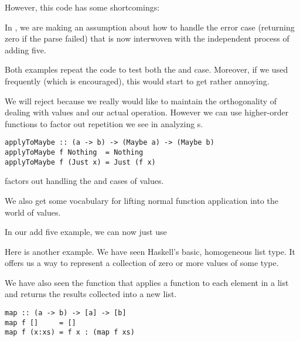 \begin{notelist}
    \item However, this code has some shortcomings:
    \begin{notelist}
        \item In , we are making an assumption about how to handle the error case
              (returning zero if the parse failed) that is now interwoven with the independent process
              of adding five.
        \item Both examples repeat the code to test both the  and  case. Moreover,
              if we used  frequently (which is encouraged), this would start to get rather
              annoying.
    \end{notelist}
\end{notelist}

We will reject  because we really would like to maintain the orthogonality of
dealing with  values and our actual operation. However we can use higher-order
functions to factor out repetition we see in analyzing s.

\begin{lstlisting}
applyToMaybe :: (a -> b) -> (Maybe a) -> (Maybe b)
applyToMaybe f Nothing  = Nothing
applyToMaybe f (Just x) = Just (f x)
\end{lstlisting}

\begin{notelist}
    \item {} factors out handling the  and  cases of 
          values.
    \item We also get some vocabulary for lifting normal function application into the world of 
          values.
    \item In our add five example, we can now just use 
\end{notelist}

Here is another example. We have seen Haskell's basic, homogeneous list type. It offers us a way to
represent a collection of zero or more values of some type.

We have also seen the function  that applies a function
to each element in a list and returns the results collected into a new list. 

\begin{lstlisting}
map :: (a -> b) -> [a] -> [b]
map f []     = []
map f (x:xs) = f x : (map f xs)
\end{lstlisting}

